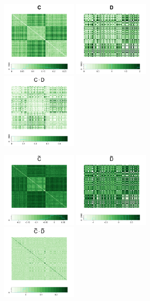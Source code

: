 \documentclass[12pt]{article}
\theoremstyle{definition}
\begin{document}
\begin{figure}[H]
	\centering
	\includegraphics[width=1.5in]{../Figure/C.png}
	\includegraphics[width=1.5in]{../Figure/D.png}
	\includegraphics[width=1.5in]{../Figure/CD.png}
	
	\includegraphics[width=1.5in]{../Figure/tildeC.png}
	\includegraphics[width=1.5in]{../Figure/tildeD.png}
	\includegraphics[width=1.5in]{../Figure/tildeCD.png}
	

\end{figure}
\end{document}
